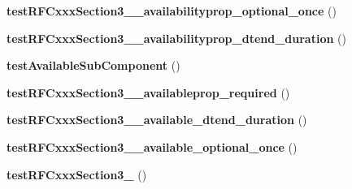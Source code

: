 \begin{DoxyCompactItemize}
{\bfseries test\+R\+F\+Cxxx\+Section3\+\_\+\_\+availabilityprop\+\_\+optional\+\_\+once} ()
\item 
\mbox{\label{class_sabre_1_1_v_object_1_1_component_1_1_v_availability_test_aeed6a40ea311625e3894e3bf890b2852}} 
{\bfseries test\+R\+F\+Cxxx\+Section3\+\_\+\_\+availabilityprop\+\_\+dtend\+\_\+duration} ()
\item 
\mbox{\label{class_sabre_1_1_v_object_1_1_component_1_1_v_availability_test_a0230a5de2078e704f84e799ac02b53ea}} 
{\bfseries test\+Available\+Sub\+Component} ()
\item 
\mbox{\label{class_sabre_1_1_v_object_1_1_component_1_1_v_availability_test_ad088ac4f1a833955ffae96f6362d04db}} 
{\bfseries test\+R\+F\+Cxxx\+Section3\+\_\+\_\+availableprop\+\_\+required} ()
\item 
\mbox{\label{class_sabre_1_1_v_object_1_1_component_1_1_v_availability_test_a121bf66eed8eec22308de8bcdb55f6a9}} 
{\bfseries test\+R\+F\+Cxxx\+Section3\+\_\+\_\+available\+\_\+dtend\+\_\+duration} ()
\item 
\mbox{\label{class_sabre_1_1_v_object_1_1_component_1_1_v_availability_test_abb83dc34d92eff808cfcf62a44152fe0}} 
{\bfseries test\+R\+F\+Cxxx\+Section3\+\_\+\_\+available\+\_\+optional\+\_\+once} ()
\item 
\mbox{\label{class_sabre_1_1_v_object_1_1_component_1_1_v_availability_test_ace8153dd6b97d06353f4b05678b36aef}} 
{\bfseries test\+R\+F\+Cxxx\+Section3\+\_} ()
\end{DoxyCompactItemize}
